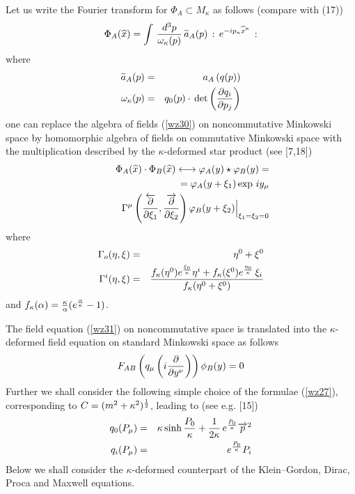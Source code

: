 \documentclass[a4paper,a4paper]{article}
\begin{document}
Let us write the Fourier transform for $\Phi_{A}\subset
M_{\kappa}$ as follows (compare with (17))
\begin{equation}\label{luma29}   %
  \Phi_{A}( \widehat{x}) = \int \, {d^{3}p \over \omega_{\kappa}
  (p)} \, \widetilde{a}_{A}(p) \, : \, e^{-ip_{\kappa}
  \widehat{x}^{\kappa}} \, :
\end{equation}
where
\begin{eqnarray}\label{luma30}       %
  \widetilde{a}_{A}(p) &= & a_{A} \left( q(p) \right)
  \\
  \omega_{\kappa}(p) &= & q_{0} (p) \cdot \, \det \left(
  {\partial q_{i}\over \partial p_{j} } \right)
  \nonumber
\end{eqnarray}
one can replace the algebra of fields
 (\ref{wz30})
 on noncommutative
Minkowski space by homomorphic algebra of fields on commutative
Minkowski space  with the multiplication described by the
$\kappa$-deformed star product (see [7,18])
\begin{eqnarray}\label{luma31} %
&&  \Phi_{A}( \widehat{x})\cdot \Phi_{B} ( \widehat{x})
  \longleftrightarrow\varphi_{A} (y) \star \varphi_{B}(y) =
  \\
  && = \varphi_{A}(y + \xi_{1} ) \exp \, iy_{\mu}
\cr
&&    \qquad
    \Gamma^{\mu}
  \left( { \overleftarrow{\partial} \over \partial \xi_{1} },
  { \overrightarrow{\partial} \over \partial \xi_{2} }
  \right) \varphi_{B} (y + \xi_{2})\Big|_{\xi_{1}=\xi_{2}=0}
  \nonumber
\end{eqnarray}
where
\begin{eqnarray}\label{luma32} %
  \Gamma_{o}(\eta,\xi) & =& \eta^{0} +\xi^{0}
  \cr
   \Gamma^{i}(\eta,\xi) &= &
{f_{\kappa}(\eta^{0}) e^{\xi_{0}\over \kappa} \eta^{i} +
f_{\kappa} (\xi^{0})
 e^{ \eta_{0}\over \kappa } \, \xi_{i} \over
f_{\kappa}(\eta^{0} +\xi^{0} )}
\end{eqnarray}
and $f_{\kappa}(\alpha) = {\kappa \over \alpha}  (e^{\alpha \over
\kappa} - 1)$.

The field equation
 (\ref{wz31})
 on noncommutative space is  translated
into the $\kappa$-deformed
 field equation on standard Minkowski space as
follows
\begin{equation}\label{luma33} %
  F_{AB} \left(
q_{\mu} \left(
i  {\partial \over \partial  y^{\nu}}
 \right) \right) \phi_{B} (y) = 0
\end{equation}
Further we shall consider the following simple choice of the
formulae
 (\ref{wz27}), corresponding   to $C=(m^{2} +\kappa^{2})^{1\over
2}$, leading to (see e.g. [15])
\begin{eqnarray}\label{luma34} %
  q_{0}(P_{\mu})& =& \kappa \sinh {P_{0}\over \kappa} +
  {1\over 2 \kappa} \, e^{P_{0}\over \kappa}
  \overrightarrow{p}^{2}
  \cr
  q_{i}(P_{\mu})
& = & e^{P_{0}\over     \kappa}  P_{i}
 \end{eqnarray}
Below we shall consider  the $\kappa$-deformed counterpart of the
Klein--Gordon, Dirac, Proca and Maxwell equations.
\end{document}
